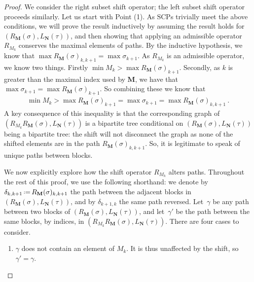 \documentclass{amsart}
\newcommand{\Guillaume}[1]{\todo[color=magenta!30]{\rm #1 \\ \hfill --- G.}}
\theoremstyle{definition}
\newcommand{\eqdef}{\mbox{\,\raisebox{0.2ex}{\scriptsize\ensuremath{\mathrm:}}\ensuremath{=}\,}} %
\newcommand{\SCP}{\mathrm{SCP}}
\begin{document}
\Guillaume{review terminology in the proof}

\begin{proof}
We consider the right subset shift operator; the left subset shift operator proceeds similarly.
Let us start with Point (1).
As $\SCP$s trivially meet the above conditions, we will prove the result inductively by assuming the result holds for $(R_{\mathbf{M}}(\sigma),L_{\mathbf{N}}(\tau))$, and then showing that applying an admissible operator $R_{M_k}$ conserves the maximal elements of paths.
By the inductive hypothesis, we know that $\max R_{\mathbf{M}}(\sigma)_{k,k+1}= \max \sigma_{k+1}$.
As $R_{M_k}$ is an admissible operator, we know two things.
Firstly $\min M_k > \max R_{\mathbf{M}}(\sigma)_{k+1}$.
Secondly, as $k$ is greater than the maximal index used by $\mathbf{M}$, we have that $\max \sigma_{k+1} = \max R_{\mathbf{M}}(\sigma)_{k+1}$.
So combining these we know that
\begin{align}
    \label{eq:shift-subset-dominates}
    \min M_k > \max R_{\mathbf{M}}(\sigma)_{k+1} = \max \sigma_{k+1} = \max R_{\mathbf{M}}(\sigma)_{k,k+1} \ . 
\end{align}
A key consequence of this inequality is that the corresponding graph of $(R_{M_k}R_{\mathbf{M}}(\sigma),L_{\mathbf{N}}(\tau))$ is a bipartite tree conditional on $(R_{\mathbf{M}}(\sigma),L_{\mathbf{N}}(\tau))$ being a bipartite tree: the shift will not disconnect the graph as none of the shifted elements are in the path $R_{\mathbf{M}}(\sigma)_{k,k+1}$. 
So, it is legitimate to speak of unique paths between blocks. 

We now explicitly explore how the shift operator $R_{M_k}$ alters paths. 
Throughout the rest of this proof, we use the following shorthand: we denote by $\delta_{k,k+1} \eqdef  R_{\mathbf{M}}(\sigma)_{k,k+1}$ the path between the adjacent blocks in $(R_{\mathbf{M}}(\sigma),L_{\mathbf{N}}(\tau))$, and by $\delta_{k+1,k}$ the same path reversed.
Let~$\gamma$ be any path between two blocks of $(R_{\mathbf{M}}(\sigma),L_{\mathbf{N}}(\tau))$, and let~$\gamma'$ be the path between the same blocks, by indices, in $(R_{M_k}R_{\mathbf{M}}(\sigma),L_{\mathbf{N}}(\tau))$. 
There are four cases to consider. 
\begin{enumerate}

    \item $\gamma$ does not contain an element of $M_k$.
    It is thus unaffected by the shift, so $\gamma' = \gamma$.


\end{enumerate}
\end{proof}
\end{document}

